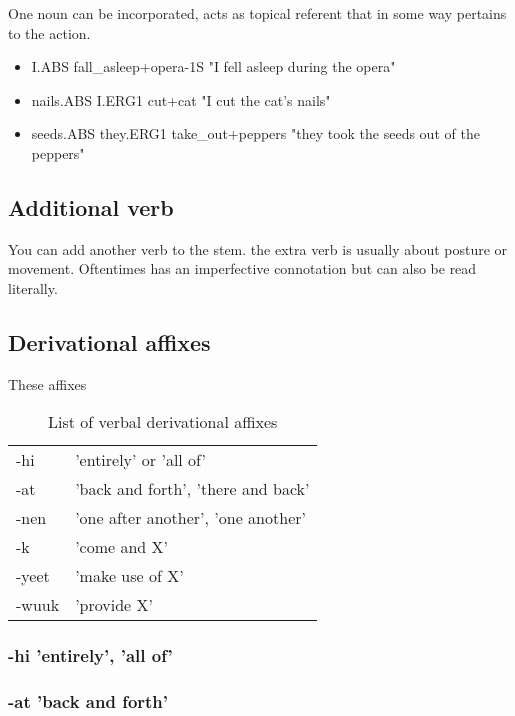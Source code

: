 \documentclass[smallroyalvopaper,9pt]{memoir} %
\begin{document}
One noun can be incorporated, acts as topical referent that in some way pertains to the action.

\begin{itemize}
    \item I.ABS fall\_asleep+opera-1S "I fell asleep during the opera"
    \item nails.ABS I.ERG1 cut+cat "I cut the cat's nails"
    \item seeds.ABS they.ERG1 take\_out+peppers "they took the seeds out of the peppers"
\end{itemize}

\subsection{Additional verb}

You can add another verb to the stem. the extra verb is usually about posture or movement. Oftentimes has an imperfective connotation but can also be read literally.

\subsection{Derivational affixes}

These affixes 

\begin{table}[ht]
    \centering
    \begin{tabular}{ll}
        \toprule
        -hi & 'entirely' or 'all of' \\
        -at & 'back and forth', 'there and back' \\
        -nen & 'one after another', 'one another' \\
        -k & 'come and X' \\
        -yeet & 'make use of X' \\
        -wuuk & 'provide X' \\
        \bottomrule
    \end{tabular}
    \caption{List of verbal derivational affixes}
\end{table}

\subsubsection{-hi 'entirely', 'all of'}

\subsubsection{-at 'back and forth'}
\end{document}
